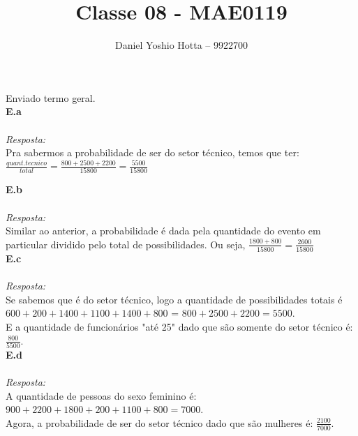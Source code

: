 \documentclass{article}
\begin{document}
	
	\title{Classe 08 - MAE0119}
	\author{Daniel Yoshio Hotta – 9922700}
	
	\maketitle	
	
	Enviado termo geral.\\
	
	\textbf {E.a} 
	\\ \\
	\textit {Resposta:} \\
    
    Pra sabermos a probabilidade de ser do setor técnico, temos que ter: $\frac{quant. tecnico}{total} = \frac{800 + 2500 + 2200}{15800} = \frac{5500}{15800}$\\
    
    \maketitle	
    
    \textbf {E.b} 
    \\ \\
    \textit {Resposta:} \\
	
    Similar ao anterior, a probabilidade é dada pela quantidade do evento em particular dividido pelo total de possibilidades. Ou seja, $\frac{1800+800}{15800} = \frac{2600}{15800}$ \\
    
    \textbf {E.c} 
    \\ \\
    \textit {Resposta:} \\
    
    Se sabemos que é do setor técnico, logo a quantidade de possibilidades totais é $600 + 200 + 1400 + 1100 + 1400 + 800$ = $800 + 2500 + 2200 = 5500$.\\
    
    E a quantidade de funcionários "até 25" dado que são somente do setor técnico é: $\frac{800}{5500}$.\\
    
    \textbf {E.d} 
    \\ \\
    \textit {Resposta:} \\
    
    A quantidade de pessoas do sexo feminino é: $900 + 2200 + 1800 + 200 + 1100 + 800 = 7000$.\\
    
    Agora, a probabilidade de ser do setor técnico dado que são mulheres é: $\frac{2100}{7000}$.\\
	
\end{document}
